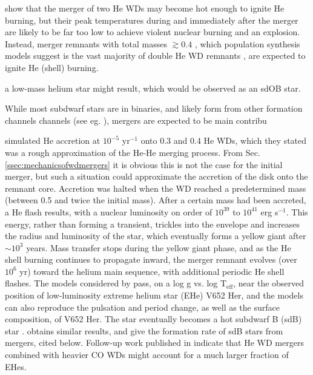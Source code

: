 
\cite{dan+12,dan+14} show that the merger of two He WDs may become hot enough to ignite He burning, but their peak temperatures during and immediately after the merger are likely to be far too low to achieve violent nuclear burning and an explosion.  Instead, merger remnants with total masses $\gtrsim 0.4$ \citep{han+03}, which population synthesis models suggest is the vast majority of double He WD remnants \citep{nele10}, are expected to ignite He (shell) burning.

a low-mass helium star might result, which would be observed as an sdOB star.  

While most subdwarf stars are in binaries, and likely form from other formation channels channels (see eg. \citealt{han+03, nele10}), mergers are expected to be main contribu

\cite{saioj00} simulated He accretion at $10^{-5}$ {\Msun} yr$^{-1}$ onto 0.3 and 0.4 {\Msun} He WDs, which they stated was a rough approximation of the He-He merging process.  From Sec. \ref{ssec:mechanicsofwdmergers} it is obvious this is not the case for the initial merger, but such a situation could approximate the accretion of the disk onto the remnant core.  Accretion was halted when the WD reached a predetermined mass (between 0.5 {\Msun} and twice the initial mass).  After a certain mass had been accreted, a He flash results, with a nuclear luminosity on order of $10^{39}$ to $10^{41}$ erg s$^{-1}$.  This energy, rather than forming a transient, trickles into the envelope and increases the radius and luminosity of the star, which eventually forms a yellow giant after $\sim 10^3$ years.  Mass transfer stops during the yellow giant phase, and as the He shell burning continues to propagate inward, the merger remnant evolves (over $10^6$ yr) toward the helium main sequence, with additional periodic He shell flashes.  The models considered by \citeauthor{saioj00} pass, on a log g vs. log T$_{\mathrm{eff}}$, near the observed position of low-luminosity extreme helium star (EHe) V652 Her, and the models can also reproduce the pulsation and period change, as well as the surface composition, of V652 Her.  The star eventually becomes a hot subdwarf B (sdB) star \citep{saioj00}.  \cite{han+02} obtains similar results, and \cite{han+03} give the formation rate of sdB stars from mergers, cited below.  Follow-up work published in \cite{saioj02} indicate that He WD mergers combined with heavier CO WDs might account for a much larger fraction of EHes.



